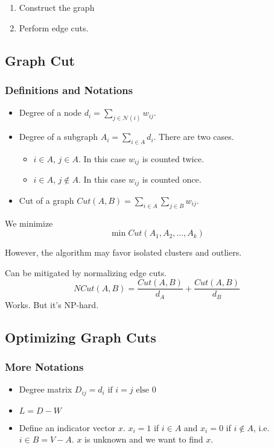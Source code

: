         \begin{enumerate}
            \item Construct the graph
            \item Perform edge cuts.
        \end{enumerate}

    \subsection{Graph Cut}
        \subsubsection{Definitions and Notations}
            \begin{itemize}
                \item Degree of a node $d_i = \sum_{j\in \mathcal{N}(i)}w_{ij}$.
                \item Degree of a subgraph $A_i = \sum_{i \in A}d_i$. There are two cases.
                    \begin{itemize}
                        \item $i \in A$, $j \in A$. In this case $w_{ij}$ is counted twice.
                        \item $i \in A$, $j \notin A$. In this case $w_{ij}$ is counted once.
                    \end{itemize}
                \item Cut of a graph $Cut(A, B) = \sum_{i \in A}\sum_{j \in B}w_{ij}$.
            \end{itemize}

        We minimize
        \[ \min Cut(A_1,A_2,\dots,A_k) \]

        However, the algorithm may favor isolated clusters and outliers.

        Can be mitigated by normalizing edge cuts.
        \[ NCut(A,B) = \frac{Cut(A,B)}{d_A} + \frac{Cut(A,B)}{d_B}\]
        Works. But it's NP-hard.

    \subsection{Optimizing Graph Cuts}
        \subsubsection{More Notations}
            \begin{itemize}
                \item Degree matrix $D_{ij} = \text{$d_i$ if $i=j$ else $0$}$
                \item $L=D-W$
                \item Define an indicator vector $x$. $x_i = 1$ if $i \in A$ and $x_i=0$ if $i \notin A$, i.e. $i \in B = V-A$. $x$ is unknown and we want to find $x$.
            \end{itemize}

